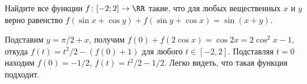 \problem
{}
Найдите все функции $f \colon [-2; 2] \to \RR$ такие, что для любых
вещественных $x$ и $y$ верно равенство
$f(\sin x + \cos y) + f(\sin y + \cos x) = \sin(x + y)$.

\solution
Подставим $y = \pi / 2 + x$, получим
$f(0) + f(2 \cos x) = \cos 2 x = 2 \cos^2 x - 1$,
откуда $f(t) = t^2 / 2 - (f(0) + 1)$ для любого $t \in [-2,2]$.
Подставляя $t = 0$ находим $f(0) = -1 / 2$, $f(t) = t^2 / 2 - 1/2$.
Легко видеть, что такая функция подходит.

\endproblem
